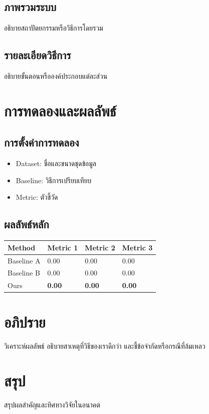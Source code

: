\documentclass[10pt,a4paper]{article}
\begin{document}
\subsection{ภาพรวมระบบ}

อธิบายสถาปัตยกรรมหรือวิธีการโดยรวม

\subsection{รายละเอียดวิธีการ}

อธิบายขั้นตอนหรือองค์ประกอบแต่ละส่วน

\section{การทดลองและผลลัพธ์}

\subsection{การตั้งค่าการทดลอง}

\begin{itemize}[nosep]
  \item Dataset: ชื่อและขนาดชุดข้อมูล
  \item Baseline: วิธีการเปรียบเทียบ
  \item Metric: ตัวชี้วัด
\end{itemize}

\subsection{ผลลัพธ์หลัก}

\vspace{8pt}
\noindent
\begin{tabular}{@{}llll@{}}
  \toprule
  \textbf{Method} & \textbf{Metric 1} & \textbf{Metric 2} & \textbf{Metric 3} \\
  \midrule
  Baseline A   & 0.00 & 0.00 & 0.00 \\
  Baseline B   & 0.00 & 0.00 & 0.00 \\
  Ours         & \textbf{0.00} & \textbf{0.00} & \textbf{0.00} \\
  \bottomrule
\end{tabular}
\vspace{8pt}

\section{อภิปราย}

วิเคราะห์ผลลัพธ์ อธิบายสาเหตุที่วิธีของเราดีกว่า
และชี้ข้อจำกัดหรือกรณีที่ล้มเหลว

\section{สรุป}

สรุปผลสำคัญและทิศทางวิจัยในอนาคต
\end{document}
